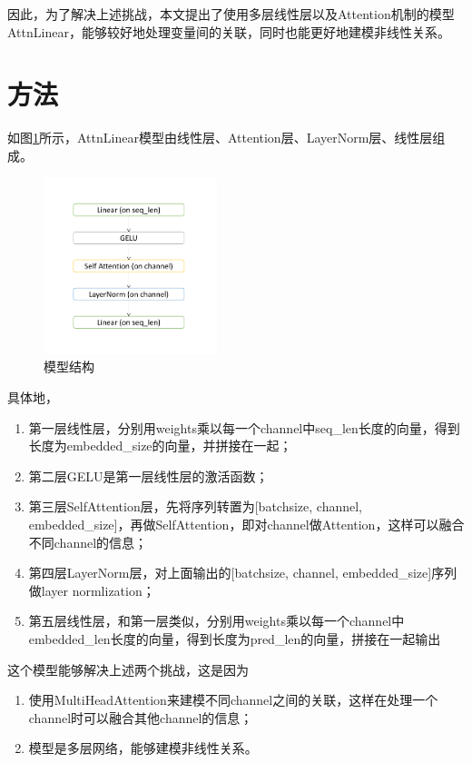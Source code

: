\documentclass{article}
\begin{document}
因此，为了解决上述挑战，本文提出了使用多层线性层以及Attention机制的模型AttnLinear，能够较好地处理变量间的关联，同时也能更好地建模非线性关系。

\section{方法}
如图\ref{fg:model}所示，AttnLinear模型由线性层、Attention层、LayerNorm层、线性层组成。
\begin{figure}[htbp]
    \centering
    \includegraphics[width=0.45\textwidth]{model}
    \caption{模型结构}
    \label{fg:model}
\end{figure}

具体地，
\begin{enumerate}
    \item 第一层线性层，分别用weights乘以每一个channel中seq\_len长度的向量，得到长度为embedded\_size的向量，并拼接在一起；
    \item 第二层GELU是第一层线性层的激活函数；
    \item 第三层SelfAttention层，先将序列转置为[batchsize, channel, embedded\_size]，再做SelfAttention，即对channel做Attention，这样可以融合不同channel的信息；
    \item 第四层LayerNorm层，对上面输出的[batchsize, channel, embedded\_size]序列做layer normlization；
    \item 第五层线性层，和第一层类似，分别用weights乘以每一个channel中embedded\_len长度的向量，得到长度为pred\_len的向量，拼接在一起输出
\end{enumerate}

这个模型能够解决上述两个挑战，这是因为
\begin{enumerate}
    \item 使用MultiHeadAttention来建模不同channel之间的关联，这样在处理一个channel时可以融合其他channel的信息；
    \item 模型是多层网络，能够建模非线性关系。
\end{enumerate}
\end{document}
